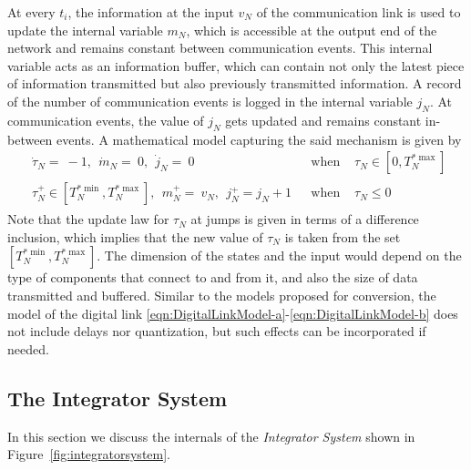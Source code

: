 \documentclass{article}
\begin{document}
\begin{enumerate}
At every $t_i$, the information at the input $v_N$ of the
communication link is used to update the internal variable 
$m_N$, which is accessible at the output end of the network
and remains constant between communication events.
This internal variable acts as an information buffer, which
can contain not only the latest piece of information transmitted
but also previously transmitted information.
A record of the number of communication events is logged in the internal variable $j_N$. At communication events, the value of $j_N$ gets updated and remains constant in-between events. 
A mathematical model capturing the said mechanism is given by
\begin{eqnarray}\label{eqn:DigitalLinkModel-a}
\left.
\begin{array}{l}
\dot{\tau}_N =\ -1,   \ \
\dot{m}_N  =\ 0,   \ \
\dot{j}_N =\ 0
\end{array}
\right. & \mbox{ when }& \tau_N \in [0,T^{*\max}_{N}] \\ 
\label{eqn:DigitalLinkModel-b}
\left.
\begin{array}{ll}
\tau_N^+  \in [T^{*\min}_{N},T^{*\max}_{N}],  \ \
m_N^+ =\ v_N,  \ \
j_N^+ = j_N+1
\end{array}
\right. & \mbox{ when }& \tau_N \leq 0
\end{eqnarray}
Note that the update law for $\tau_N$ at jumps is given in terms of a difference inclusion,
which implies that the new value of $\tau_N$ is taken from the set $[T^{*\min}_{N},T^{*\max}_{N}]$.
The dimension of the states and the input would depend on 
the type of components that connect to and from it, and also the size of data transmitted and buffered.
Similar to the models proposed for conversion, 
the model of the digital link \eqref{eqn:DigitalLinkModel-a}-\eqref{eqn:DigitalLinkModel-b}
does not include delays nor quantization, but such effects can be incorporated if needed.
\medskip


\end{enumerate}

\subsection{The Integrator System}
\label{sec:integratorsystem}
In this section we discuss the internals of the {\em Integrator System} shown in Figure~\ref{fig:integratorsystem}.
\end{document}

